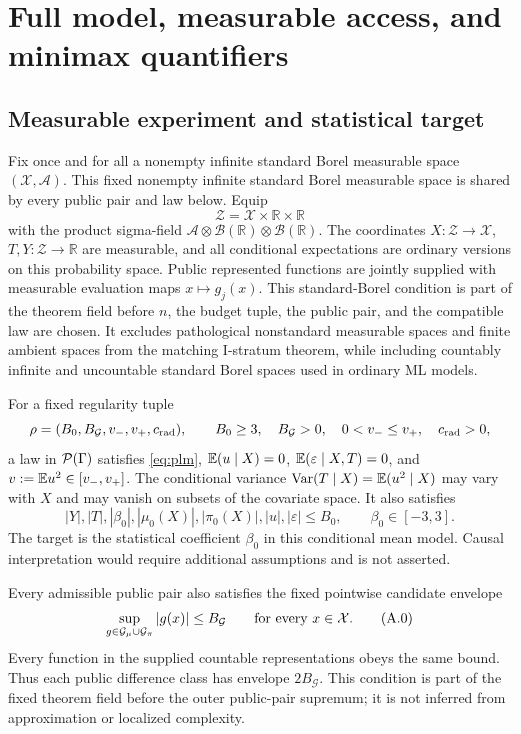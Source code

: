 \section{Full model, measurable access, and minimax quantifiers}
\label{app:model}

\subsection{Measurable experiment and statistical target}

Fix once and for all a nonempty infinite standard Borel measurable space
\((\mathcal X,\mathcal A)\).  This fixed nonempty infinite standard Borel measurable space is shared by every public pair and law below.  Equip
\[
 \mathcal Z=\mathcal X\times\mathbb R\times\mathbb R
\]
with the product sigma-field
\(\mathcal A\otimes\mathcal B(\mathbb R)\otimes
\mathcal B(\mathbb R)\).  The coordinates
\(X:\mathcal Z\to\mathcal X\), \(T,Y:\mathcal Z\to\mathbb R\) are
measurable, and all conditional expectations are ordinary versions on this
probability space.  Public represented functions are jointly supplied with
measurable evaluation maps \(x\mapsto g_j(x)\).  This standard-Borel
condition is part of the theorem field before \(n\), the budget tuple, the
public pair, and the compatible law are chosen.  It excludes pathological
nonstandard measurable spaces and finite ambient spaces from the matching
I-stratum theorem, while including countably infinite and uncountable
standard Borel spaces used in ordinary ML models.

For a fixed regularity tuple
\[
 \rho=(B_0,B_{\mathcal G},v_-,v_+,c_{\rm rad}),\qquad
 B_0\ge3,\quad B_{\mathcal G}>0,\quad
 0<v_-\le v_+,\quad c_{\rm rad}>0,
\]
a law in \(\mathcal P(\Gamma)\) satisfies \eqref{eq:plm},
\(\mathbb E(u\mid X)=0\), \(\mathbb E(\varepsilon\mid X,T)=0\), and
\(v:=\mathbb E u^2\in[v_-,v_+]\).  The conditional variance
\(\operatorname{Var}(T\mid X)=\mathbb E(u^2\mid X)\) may vary with \(X\)
and may vanish on subsets of the covariate space.  It also satisfies
\[
 |Y|,|T|,|\beta_0|,|\mu_0(X)|,|\pi_0(X)|,|u|,|\varepsilon|
 \le B_0,\qquad \beta_0\in[-3,3].
\]
The target is the statistical coefficient \(\beta_0\) in this conditional
mean model.  Causal interpretation would require additional assumptions and
is not asserted.

Every admissible public pair also satisfies the fixed pointwise candidate
envelope
\[
 \sup_{g\in\mathcal G_\mu\cup\mathcal G_\pi}|g(x)|\le B_{\mathcal G}
 \qquad\text{for every }x\in\mathcal X.
 \tag{A.0}
\]
Every function in the supplied countable representations obeys the same
bound.  Thus each public difference class has envelope \(2B_{\mathcal G}\).
This condition is part of the fixed theorem field before the outer public-pair
supremum; it is not inferred from approximation or localized complexity.

